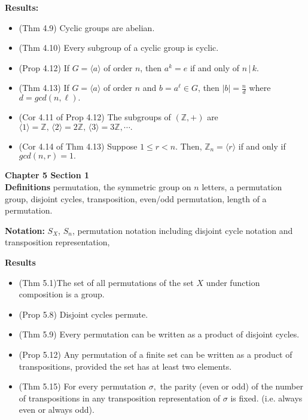 \documentclass[12pt]{article}
\newcommand{\bbZ}{\mathbb{Z}}
\newcommand{\divs}{\, \big | \,}
\begin{document}
\textbf{Results:}
\begin{itemize}
	\item (Thm 4.9) Cyclic groups are abelian.
	\item (Thm 4.10) Every subgroup of a cyclic group is cyclic.
	\item (Prop 4.12) If $G=\langle a \rangle$ of order $n$, then $a^k=e$ if and only of $n \divs k.$
	\item (Thm 4.13)  If $G=\langle a \rangle$ of order $n$ and $b=a^\ell \in G$, then $|b|=\frac{n}{d}$ where $d=gcd(n,\ell).$
	\item (Cor 4.11 of Prop 4.12) The subgroups of $(\bbZ,+)$ are $\langle 1 \rangle=\bbZ, \, \langle 2 \rangle=2\bbZ, \, \langle 3 \rangle=3\bbZ, \cdots.$
	\item  (Cor 4.14 of Thm 4.13) Suppose $1 \leq r < n.$ Then,
	$\bbZ_n=\langle r \rangle$ if and only if $gcd(n,r)=1.$
\end{itemize}



\noindent \textbf{Chapter 5 Section 1}\\

\textbf{Definitions} permutation, the symmetric group on $n$ letters, a permutation group, disjoint cycles, transposition, even/odd permutation, length of a permutation.

\textbf{Notation:} $S_X$, $S_n$, permutation notation including disjoint cycle notation and transposition representation,

\textbf{Results}
\begin{itemize}
	\item (Thm 5.1)The set of all permutations of the set $X$ under function composition is a group.
	\item (Prop 5.8) Disjoint cycles permute.
	\item (Thm 5.9) Every permutation can be written as a product of disjoint cycles.
	\item (Prop 5.12) Any permutation of a finite set can be written as a product of transpositions, provided the set has at least two elements.
	\item (Thm 5.15) For every permutation $\sigma,$ the parity (even or odd) of the number of transpositions in any transposition representation of $\sigma$ is fixed. (i.e. always even or always odd).
\end{itemize}
\end{document}
